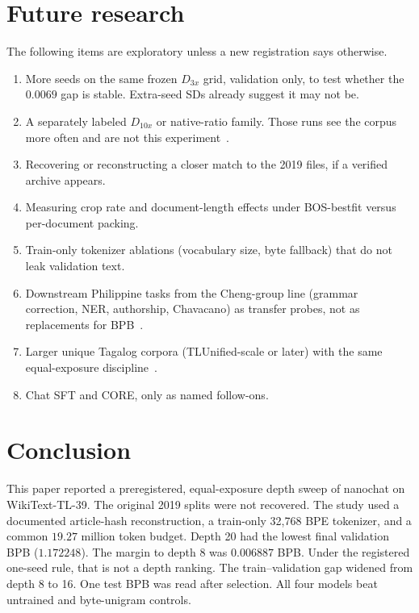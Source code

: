\documentclass[11pt,a4paper]{article}
\begin{document}
\section{Future research}
\label{sec:future}

The following items are exploratory unless a new registration says otherwise.

\begin{enumerate}
\item More seeds on the same frozen $D_{3x}$ grid, validation only, to test whether the $0.0069$ gap is stable. Extra-seed SDs already suggest it may not be.
\item A separately labeled $D_{10x}$ or native-ratio family. Those runs see the corpus more often and are not this experiment~\cite{muennighoff2023dataconstrained}.
\item Recovering or reconstructing a closer match to the 2019 files, if a verified archive appears.
\item Measuring crop rate and document-length effects under BOS-bestfit versus per-document packing.
\item Train-only tokenizer ablations (vocabulary size, byte fallback) that do not leak validation text.
\item Downstream Philippine tasks from the Cheng-group line (grammar correction, NER, authorship, Chavacano) as transfer probes, not as replacements for BPB~\cite{espiritu2023balarila,chan2023ner,espiritu2024aa,vicente2026chavacano}.
\item Larger unique Tagalog corpora (TLUnified-scale or later) with the same equal-exposure discipline~\cite{cruz2022tlunified}.
\item Chat SFT and CORE, only as named follow-ons.
\end{enumerate}

\section{Conclusion}
\label{sec:conclusion}

This paper reported a preregistered, equal-exposure depth sweep of nanochat on WikiText-TL-39. The original 2019 splits were not recovered. The study used a documented article-hash reconstruction, a train-only 32{,}768 BPE tokenizer, and a common $19.27$ million token budget. Depth 20 had the lowest final validation BPB ($1.172248$). The margin to depth 8 was $0.006887$ BPB. Under the registered one-seed rule, that is not a depth ranking. The train--validation gap widened from depth 8 to 16. One test BPB was read after selection. All four models beat untrained and byte-unigram controls.
\end{document}
